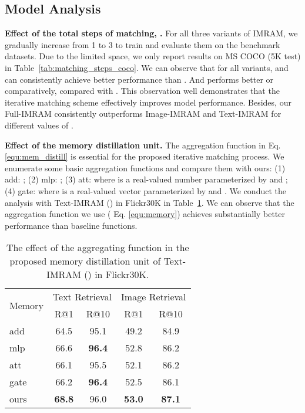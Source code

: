\documentclass[10pt,twocolumn,letterpaper]{article}
\begin{document}
\subsection{Model Analysis}
\textbf{Effect of the total steps of matching, .}
For all three variants of IMRAM, we gradually increase  from 1 to 3 to train and evaluate them on the benchmark datasets. Due to the limited space, we only report results on MS COCO (5K test) in Table~\ref{tab:matching_steps_coco}. We can observe that for all variants,  and  can consistently achieve better performance than . And  performs better or comparatively, compared with . This observation well demonstrates that the iterative matching scheme effectively improves model performance. Besides, our Full-IMRAM consistently outperforms Image-IMRAM and Text-IMRAM for different values of .



\textbf{Effect of the memory distillation unit.} The aggregation function  in Eq. \ref{equ:mem_distill} is essential for the proposed iterative matching process. We enumerate some basic aggregation functions and compare them with ours: (1) \textsf{add}: ; (2) \textsf{mlp}: ; (3) \textsf{att}:  where  is a real-valued number parameterized by  and ; (4) \textsf{gate}:  where  is a real-valued vector parameterized by  and . We conduct the analysis with Text-IMRAM () in Flickr30K in Table~\ref{tab:memory_flickr}. We can observe that the aggregation function we use (\ie{} Eq. \ref{equ:memory}) achieves substantially better performance than baseline functions.





\begin{table}
\centering
\caption{The effect of the aggregating function in the proposed memory distillation unit of Text-IMRAM () in Flickr30K.}
\label{tab:memory_flickr}
\begin{tabular}{l|cccc}
  \hline
  \multirow{2}{*}{Memory} &
  \multicolumn{2}{c}{Text Retrieval} &
  \multicolumn{2}{c}{Image Retrieval} \\
  & R@1 & R@10 & R@1 & R@10\\
  \hline
  \textsf{add} &64.5 &95.1 &49.2 &84.9 \\
  \textsf{mlp} &66.6 &\textbf{96.4} &52.8 &86.2 \\
  \textsf{att} &66.1 &95.5 &52.1 &86.2 \\
  \textsf{gate} &66.2 &\textbf{96.4} &52.5 &86.1 \\
  \textsf{ours} &\textbf{68.8} &96.0 &\textbf{53.0} &\textbf{87.1}\\
  \hline
\end{tabular}\end{table}
\end{document}
